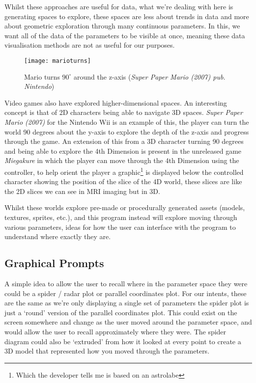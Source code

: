 Whilst these approaches are useful for data, what we're dealing with here is
generating spaces to explore, these spaces are less about trends in data and
more about geometric exploration through many continuous parameters. In this, we
want all of the data of the parameters to be visible at once, meaning these data
visualisation methods are not as useful for our purposes.

\begin{figure}[H]
    \centering
    \texttt{[image: marioturns]}
    \caption{Mario turns $90^\circ$ around the z-axis (\emph{Super Paper Mario
    (2007) pub. Nintendo})}
\end{figure}

Video games also have explored higher-dimensional spaces. An interesting concept
is that of 2D characters being able to navigate 3D spaces.  \emph{Super Paper
Mario (2007)} for the Nintendo Wii is an example of this, the player can turn
the world 90 degrees about the y-axis to explore the depth of the z-axis and
progress through the game. An extension of this from a 3D character turning 90
degrees and being able to explore the 4th Dimension is present in the unreleased
game \emph{Miegakure} in which the player can move through the 4th Dimension
using the controller, to help orient the player a graphic\footnote{Which the
developer tells me is based on an astrolabe} is displayed below the controlled
character showing the position of the slice of the 4D world, these slices are
like the 2D slices we can see in MRI imaging but in 3D.

Whilst these worlds explore pre-made or procedurally generated assets (models,
textures, sprites, etc.), and this program instead will explore moving through
various parameters, ideas for how the user can interface with the program to
understand where exactly they are.

\subsection{Graphical Prompts}
A simple idea to allow the user to recall where in the parameter space they were
could be a spider / radar plot or parallel coordinates plot. For our intents, these
are the same as we're only displaying a single set of parameters the spider plot
is just a `round' version of the parallel coordinates plot. This could exist on
the screen somewhere and change as the user moved around the parameter space,
and would allow the user to recall approximately where they were. The spider
diagram could also be `extruded' from how it looked at every point to create a
3D model that represented how you moved through the parameters.

